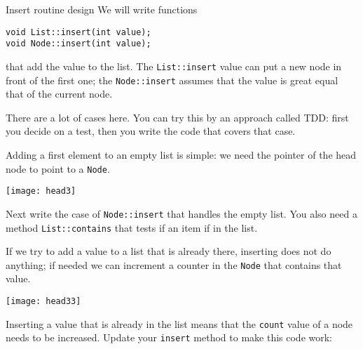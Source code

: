 \begin{block}{Insert routine design}
  \label{sl:linklist-insert-proto}
  We will write functions
\begin{lstlisting}
void List::insert(int value);
void Node::insert(int value);
\end{lstlisting}
that add the value to the list.
The \lstinline{List::insert} value can put a new node in front of the first one;
the \lstinline{Node::insert} assumes that the value is great equal that of the current node.
\end{block}

There are a lot of cases here. You can try this by an approach called
\acf{TDD}: first you decide on a test, then you write the code that
covers that case.






Adding a first element to an empty list is simple:
we need the pointer of the head node
to point to a \lstinline{Node}.

\texttt{[image: head3]}

\begin{exercise}
  \label{ex:listlist-insert-empty}
  Next write the case of \lstinline{Node::insert} that handles the empty
  list. You also need a method \lstinline{List::contains} that tests if an
  item if in the list.
\end{exercise}


If we try to add a value to a list that is already there,
inserting does not do anything;
if needed we can increment a counter in the 
\lstinline{Node} that contains that value.

\texttt{[image: head33]}

\begin{exercise}
  \label{ex:linklist-insert-already}
  Inserting a value that is already in the list means that the
  \lstinline{count} value of a node needs to be increased. Update your
  \lstinline{insert} method to make this code work:
\end{exercise}

